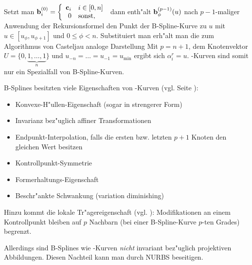 Setzt man 
${\bf b}_i^{(0)} = \left\{ \begin{array}{rl}  {\bf c}_i & i \in [0, n]\\
			   0	     & \mbox{sonst,}  \end{array} \right.$
dann enth"alt ${\bf b}_{\phi}^{(p-1)}(u)$ nach $p-1$-maliger Anwendung der 
Rekursionsformel
den Punkt der B-Spline-Kurve zu $u$ mit $u \in [u_{\phi}, u_{\phi+1}]$ und 
$0 \le \phi < n$.
Substituiert man 
erh"alt man die zum Algorithmus von Casteljau analoge Darstellung
Mit $p = n + 1$, dem Knotenvektor $U = \{0, \underbrace{1, \dots, 1}_{n}\}$ 
und $u_{-n} = \dots = u_{-1} = u_{\min}$ ergibt sich $\alpha_i^r = u$.
\bez-Kurven sind somit nur ein Spezialfall von B-Spline-Kurven.

B-Splines besitzten viele Eigenschaften von \bez-Kurven 
(vgl. Seite \pageref{bez_props}):
\begin{itemize}
\item Konvexe-H"ullen-Eigenschaft (sogar in strengerer Form)
\item Invarianz bez"uglich affiner Transformationen 
\item Endpunkt-Interpolation, falls die ersten bzw. letzten $p+1$ Knoten den 
    gleichen Wert besitzen
\item Kontrollpunkt-Symmetrie
\item Formerhaltungs-Eigenschaft 
\item Beschr"ankte Schwankung (variation diminishing)
\end{itemize}

Hinzu kommt die lokale Tr"agereigenschaft 
(vgl. ): 
Modifikationen an einem Kontrollpunkt bleiben auf $p$ Nachbarn (bei einer 
B-Spline-Kurve $p$-ten Grades) begrenzt.

Allerdings sind B-Splines wie \bez-Kurven \emph{nicht} invariant bez"uglich 
projektiven Abbildungen. Diesen Nachteil kann man durch NURBS beseitigen.

